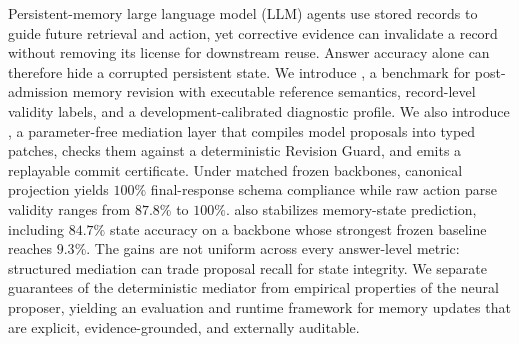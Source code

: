 Persistent-memory large language model (LLM) agents use stored records to guide future retrieval and action, yet corrective evidence can invalidate a record without removing its license for downstream reuse. Answer accuracy alone can therefore hide a corrupted persistent state. We introduce \bench{}, a benchmark for post-admission memory revision with executable reference semantics, record-level validity labels, and a development-calibrated diagnostic profile. We also introduce \method{}, a parameter-free mediation layer that compiles model proposals into typed patches, checks them against a deterministic Revision Guard, and emits a replayable commit certificate. Under matched frozen backbones, canonical projection yields $100\%$ final-response schema compliance while raw action parse validity ranges from $87.8\%$ to $100\%$. \method{} also stabilizes memory-state prediction, including $84.7\%$ state accuracy on a backbone whose strongest frozen baseline reaches $9.3\%$. The gains are not uniform across every answer-level metric: structured mediation can trade proposal recall for state integrity. We separate guarantees of the deterministic mediator from empirical properties of the neural proposer, yielding an evaluation and runtime framework for memory updates that are explicit, evidence-grounded, and externally auditable.
